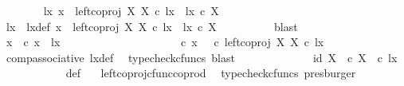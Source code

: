 \begin{isabellebody}
\ \ \ \ \ \ \isamarkupfalse%
\ {\isachardoublequoteopen}{\isasymexists}lx{\isachardot}{\kern0pt}\ x\ {\isacharequal}{\kern0pt}\ left{\isacharunderscore}{\kern0pt}coproj\ X\ X\ {\isasymcirc}\isactrlsub c\ lx\ {\isasymand}\ lx\ {\isasymin}\isactrlsub c\ X{\isachardoublequoteclose}\isanewline
\ \ \ \ \ \ \isamarkupfalse%
\ \isamarkupfalse%
\ lx\ \ lx{\isacharunderscore}{\kern0pt}def{\isacharcolon}{\kern0pt}\ {\isachardoublequoteopen}x\ {\isacharequal}{\kern0pt}\ left{\isacharunderscore}{\kern0pt}coproj\ X\ X\ {\isasymcirc}\isactrlsub c\ lx\ {\isasymand}\ lx\ {\isasymin}\isactrlsub c\ X{\isachardoublequoteclose}\isanewline
\ \ \ \ \ \ \ \ \isamarkupfalse%
\ blast\isanewline
\ \ \ \ \ \ \isamarkupfalse%
\ {\isasymrho}x{\isacharcolon}{\kern0pt}\ {\isachardoublequoteopen}{\isasymrho}\ {\isasymcirc}\isactrlsub c\ x\ {\isacharequal}{\kern0pt}\ {\isasymlangle}lx{\isacharcomma}{\kern0pt}\ {\isasymt}{\isasymrangle}{\isachardoublequoteclose}\isanewline
\ \ \ \ \ \ \isamarkupfalse%
\ {\isacharminus}{\kern0pt}\ \isanewline
\ \ \ \ \ \ \ \ \isamarkupfalse%
\ {\isachardoublequoteopen}{\isasymrho}\ {\isasymcirc}\isactrlsub c\ x\ {\isacharequal}{\kern0pt}\ {\isacharparenleft}{\kern0pt}{\isasymrho}\ {\isasymcirc}\isactrlsub c\ left{\isacharunderscore}{\kern0pt}coproj\ X\ X{\isacharparenright}{\kern0pt}\ {\isasymcirc}\isactrlsub c\ lx{\isachardoublequoteclose}\isanewline
\ \ \ \ \ \ \ \ \ \ \isamarkupfalse%
\ comp{\isacharunderscore}{\kern0pt}associative{}\ lx{\isacharunderscore}{\kern0pt}def\ \isamarkupfalse%
\ {\isacharparenleft}{\kern0pt}typecheck{\isacharunderscore}{\kern0pt}cfuncs{\isacharcomma}{\kern0pt}\ blast{\isacharparenright}{\kern0pt}\isanewline
\ \ \ \ \ \ \ \ \isamarkupfalse%
\ \isamarkupfalse%
\ {\isachardoublequoteopen}{\isachardot}{\kern0pt}{\isachardot}{\kern0pt}{\isachardot}{\kern0pt}\ {\isacharequal}{\kern0pt}\ {\isasymlangle}id\ X{\isacharcomma}{\kern0pt}\ {\isasymt}\ {\isasymcirc}\isactrlsub c\ {\isasymbeta}\isactrlbsub X\isactrlesub {\isasymrangle}\ \ {\isasymcirc}\isactrlsub c\ lx{\isachardoublequoteclose}\isanewline
\ \ \ \ \ \ \ \ \ \ \isamarkupfalse%
\ {\isasymrho}{\isacharunderscore}{\kern0pt}def\ \ \isamarkupfalse%
\ left{\isacharunderscore}{\kern0pt}coproj{\isacharunderscore}{\kern0pt}cfunc{\isacharunderscore}{\kern0pt}coprod\ \isamarkupfalse%
\ {\isacharparenleft}{\kern0pt}typecheck{\isacharunderscore}{\kern0pt}cfuncs{\isacharcomma}{\kern0pt}\ presburger{\isacharparenright}{\kern0pt}\isanewline

\end{isabellebody}
